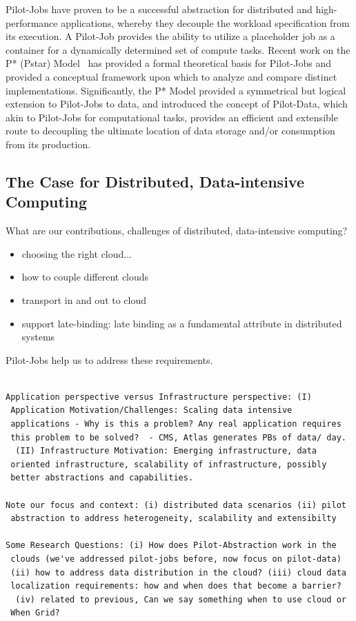 \documentclass[times]{cpeauth}
\newcommand{\pilotjob}{Pilot-Job\xspace}
\newcommand{\pilotjobs}{Pilot-Jobs\xspace}
\begin{document}
\pilotjobs have proven to be a successful abstraction for distributed and
high-performance applications, whereby they decouple the workload
specification from its execution. A \pilotjob provides the ability to utilize
a placeholder job as a container for a dynamically determined set of compute
tasks. Recent work on the P* (Pstar) Model~\cite{pstar12} has provided a
formal theoretical basis for Pilot-Jobs and provided a conceptual framework
upon which to analyze and compare distinct implementations. Significantly, the
P* Model provided a symmetrical but logical extension to Pilot-Jobs to data,
and introduced the concept of Pilot-Data, which akin to Pilot-Jobs for
computational tasks, provides an efficient and extensible route to decoupling
the ultimate location of data storage and/or consumption from its production.

\subsection*{The Case for Distributed, Data-intensive Computing}

What are our contributions, challenges of distributed, data-intensive computing?
\begin{itemize}
	\item choosing the right cloud... 
	\item how to couple different clouds
	\item transport in and out to cloud
	\item support late-binding: late binding as a fundamental attribute in 
	distributed systems
\end{itemize}
Pilot-Jobs help us to address these requirements.



\begin{verbatim}

Application perspective versus Infrastructure perspective: (I)
 Application Motivation/Challenges: Scaling data intensive
 applications - Why is this a problem? Any real application requires
 this problem to be solved?  - CMS, Atlas generates PBs of data/ day.
  (II) Infrastructure Motivation: Emerging infrastructure, data
 oriented infrastructure, scalability of infrastructure, possibly
 better abstractions and capabilities.

Note our focus and context: (i) distributed data scenarios (ii) pilot
 abstraction to address heterogeneity, scalability and extensibilty

Some Research Questions: (i) How does Pilot-Abstraction work in the
 clouds (we've addressed pilot-jobs before, now focus on pilot-data)
 (ii) how to address data distribution in the cloud? (iii) cloud data
 localization requirements: how and when does that become a barrier?
  (iv) related to previous, Can we say something when to use cloud or
 When Grid?

\end{verbatim}
\end{document}
